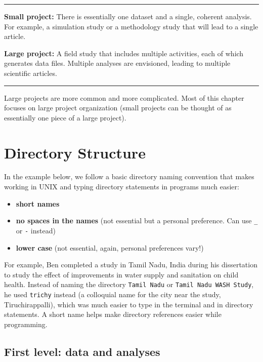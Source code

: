 \documentclass[]{book}
\providecommand{\tightlist}{%
  \setlength{\itemsep}{0pt}\setlength{\parskip}{0pt}}
\begin{document}
\begin{center}\rule{0.5\linewidth}{\linethickness}\end{center}

\textbf{Small project:} There is essentially one dataset and a single, coherent analysis. For example, a simulation study or a methodology study that will lead to a single article.

\textbf{Large project:} A field study that includes multiple activities, each of which generates data files. Multiple analyses are envisioned, leading to multiple scientific articles.

\begin{center}\rule{0.5\linewidth}{\linethickness}\end{center}

Large projects are more common and more complicated. Most of this chapter focuses on large project organization (small projects can be thought of as essentially one piece of a large project).

\hypertarget{directory-structure}{%
\section{Directory Structure}\label{directory-structure}}

In the example below, we follow a basic directory naming convention that makes working in UNIX and typing directory statements in programs much easier:

\begin{itemize}
\tightlist
\item
  \textbf{short names}
\item
  \textbf{no spaces in the names} (not essential but a personal preference. Can use \texttt{\_} or \texttt{-} instead)
\item
  \textbf{lower case} (not essential, again, personal preferences vary!)
\end{itemize}

For example, Ben completed a study in Tamil Nadu, India during his dissertation to study the effect of improvements in water supply and sanitation on child health. Instead of naming the directory \texttt{Tamil\ Nadu} or \texttt{Tamil\ Nadu\ WASH\ Study}, he used \texttt{trichy} instead (a colloquial name for the city near the study, Tiruchirappalli), which was much easier to type in the terminal and in directory statements. A short name helps make directory references easier while programming.

\hypertarget{first-level-data-and-analyses}{%
\subsection{First level: data and analyses}\label{first-level-data-and-analyses}}
\end{document}
